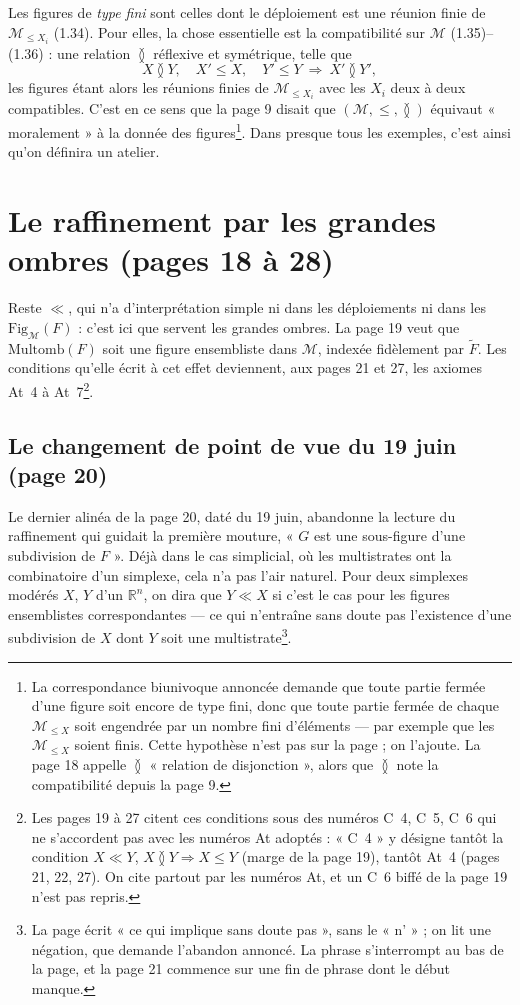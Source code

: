 \documentclass[11pt,a4paper]{article}
\begin{document}
Les figures de \emph{type fini} sont celles dont le déploiement est une réunion
finie de $\mathcal{M}_{\leq X_{i}}$ (1.34). Pour elles, la chose essentielle est
la compatibilité sur $\mathcal{M}$ (1.35)--(1.36) : une relation $\between$
réflexive et symétrique, telle que
\[
X \between Y, \quad X' \leq X, \quad Y' \leq Y \ \Longrightarrow\ X' \between Y'
,
\]
les figures étant alors les réunions finies de $\mathcal{M}_{\leq X_{i}}$ avec les
$X_{i}$ deux à deux compatibles. C'est en ce sens que la page 9 disait que
$(\mathcal{M}, \leq, \between)$ équivaut « moralement » à la donnée des
figures\footnote{La correspondance biunivoque annoncée demande que toute partie
fermée d'une figure soit encore de type fini, donc que toute partie fermée de
chaque $\mathcal{M}_{\leq X}$ soit engendrée par un nombre fini d'éléments ---
par exemple que les $\mathcal{M}_{\leq X}$ soient finis. Cette hypothèse n'est
pas sur la page ; on l'ajoute. La page 18 appelle $\between$ « relation de
disjonction », alors que $\between$ note la compatibilité depuis la page 9.}.
Dans presque tous les exemples, c'est ainsi qu'on définira un atelier.

\section*{Le raffinement par les grandes ombres (pages 18 à 28)}

Reste $\ll$, qui n'a d'interprétation simple ni dans les déploiements ni dans les
$\mathrm{Fig}_{\mathcal{M}}(F)$ : c'est ici que servent les grandes ombres. La
page 19 veut que $\mathrm{Multomb}(F)$ soit une figure ensembliste dans
$\mathcal{M}$, indexée fidèlement par $\widetilde{F}$. Les conditions qu'elle
écrit à cet effet deviennent, aux pages 21 et 27, les axiomes At~4 à
At~7\footnote{Les pages 19 à 27 citent ces conditions sous des numéros C~4, C~5,
C~6 qui ne s'accordent pas avec les numéros At adoptés : « C~4 » y désigne tantôt
la condition $X \ll Y$, $X \between Y \Rightarrow X \leq Y$ (marge de la page
19), tantôt At~4 (pages 21, 22, 27). On cite partout par les numéros At, et un
C~6 biffé de la page 19 n'est pas repris.}.

\subsection*{Le changement de point de vue du 19 juin (page 20)}

Le dernier alinéa de la page 20, daté du 19 juin, abandonne la lecture du
raffinement qui guidait la première mouture, « $G$ est une sous-figure d'une
subdivision de $F$ ». Déjà dans le cas simplicial, où les multistrates ont la
combinatoire d'un simplexe, cela n'a pas l'air naturel. Pour deux simplexes
modérés $X$, $Y$ d'un $\mathbb{R}^{n}$, on dira que $Y \ll X$ si c'est le cas pour
les figures ensemblistes correspondantes --- ce qui n'entraîne sans doute pas
l'existence d'une subdivision de $X$ dont $Y$ soit une multistrate\footnote{La
page écrit « ce qui implique sans doute pas », sans le « n' » ; on lit une
négation, que demande l'abandon annoncé. La phrase s'interrompt au bas de la
page, et la page 21 commence sur une fin de phrase dont le début manque.}.
\end{document}
